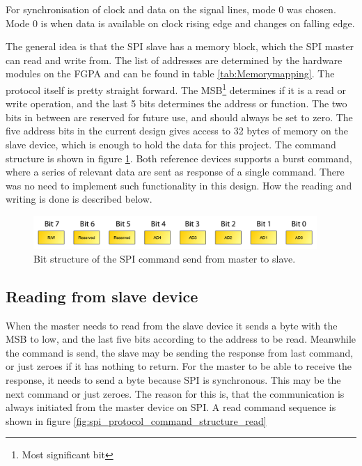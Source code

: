 For synchronisation of clock and data on the signal lines, mode 0 was chosen. Mode 0 is when data is available on clock rising edge and changes on falling edge.

The general idea is that the SPI slave has a memory block, which the SPI master can read and write from. The list of addresses are determined by the hardware modules on the FGPA and can be found in table \ref{tab:Memorymapping}. The protocol itself is pretty straight forward. The MSB\footnote{Most significant bit} determines if it is a read or write operation, and the last 5 bits determines the address or function. The two bits in between are reserved for future use, and should always be set to zero. The five address bits in the current design gives access to 32 bytes of memory on the slave device, which is enough to hold the data for this project. The command structure is shown in figure \ref{fig:spi_protocol_cmd_structure}. Both reference devices supports a burst command, where a series of relevant data are sent as response of a single command. There was no need to implement such functionality in this design. How the reading and writing is done is described below.
\begin{figure}[htb]
	\centering
	\includegraphics[width=0.96\textwidth,trim=0 0 0 0]{graphics/spi_protocol_cmd_structure.pdf} %
	\caption{Bit structure of the SPI command send from master to slave.}
	\label{fig:spi_protocol_cmd_structure}			%
\end{figure}


\subsection{Reading from slave device}
When the master needs to read from the slave device it sends a byte with the MSB to low, and the last five bits according to the address to be read. Meanwhile the command is send, the slave may be sending the response from last command, or just zeroes if it has nothing to return. For the master to be able to receive the response, it needs to send a byte because SPI is synchronous. This may be the next command or just zeroes. The reason for this is, that the communication is always initiated from the master device on SPI. A read command sequence is shown in figure \ref{fig:spi_protocol_command_structure_read} 

